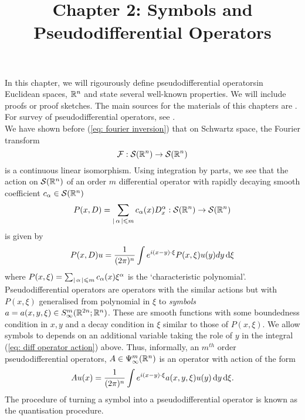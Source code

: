 \documentclass[12pt]{article}
\title{Chapter 2: Symbols and Pseudodifferential Operators}
\date{}
\begin{document}
\maketitle


In this chapter, we will rigourously define pseudodifferential operatorsin Euclidean spaces, $\R^n$ and state several well-known properties. We will include proofs or proof sketches. The main sources for the materials of this chapters are \cite{rbm_intro_microlocal, Vasy2015-oo,Semyon_Dyatlov2018-uk, Taylor1991-rq}. For survey of pseudodifferential operators, see \cite{Schonert2006-hp,Martinez2002-xg,Wunsch2008-yo}. \\

 We have shown before (\ref{eq: fourier inversion}) that on Schwartz space,  the Fourier transform 
 $$\F : \sch(\R^n) \to \sch(\R^n)$$
is a continuous linear isomorphism. Using integration by parts, we see that the action on $\sch(\R^n)$ of an order $m$ differential operator with rapidly decaying smooth coefficient $c_\alpha \in \sch(\R^n)$ 
\begin{align}
P(x, D) = \sum_{\abs{\alpha} \leq m } c_\alpha(x) D^\alpha_x : \sch(\R^n) \to \sch(\R^n) \label{eq: general diff op} 
\end{align}
is given by 
\begin{align}
P(x, D)u = \frac{1}{(2\pi)^n} \int e^{i (x - y) \cdot \xi} P(x, \xi) u(y) dy \d[\xi]  \label{eq: diff operator action} 
\end{align}
where $P(x, \xi) = \sum_{\abs{\alpha} \leq m} c_\alpha(x) \xi^\alpha$ is the `characteristic polynomial'. \\

Pseudodifferential operators are operators with the similar actions but with $P(x, \xi)$ generalised from polynomial in $\xi$ to \textit{symbols} $a = a(x, y, \xi) \in S^m_\infty(\R^{2n}; \R^n)$. These are smooth functions with some boundedness condition in $x, y$ and a decay condition in $\xi$ similar to those of $P(x, \xi)$. We allow symbols to depends on an additional variable taking the role of $y$ in the integral (\ref{eq: diff operator action}) above. Thus, informally, an $m^{th}$ order pseudodifferential operators, $A \in \Psi^{m}_{\infty}(\R^n)$ is an operator with action of the form
\begin{align*}
Au(x) = \frac{1}{(2\pi)^n} \int e^{i (x - y) \cdot \xi} a(x, y, \xi) u(y) \d[y] \d[\xi]. 
\end{align*}
The procedure of turning a symbol into a pseudodifferential operator is known as the quantisation procedure. \\
\end{document}
